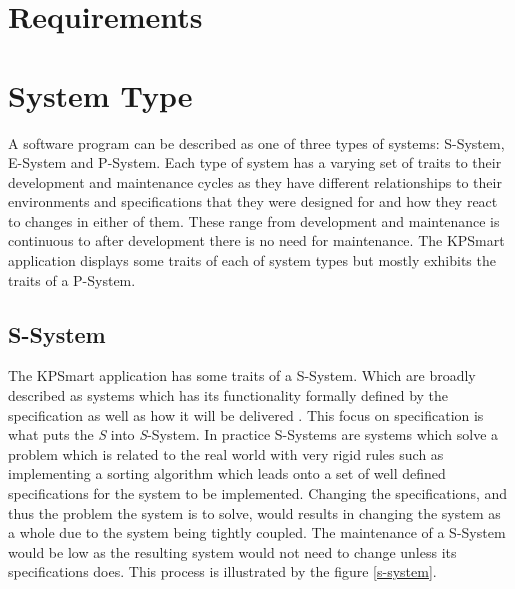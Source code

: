 \documentclass{style/CRPITStyle}
\renewcommand{\cite}{\citep}
\begin{document}
\section{Requirements}


\section{System Type}

A software program can be described as one of three types of systems:
S-System, E-System and P-System. Each type of system has a varying set of traits
to their development and maintenance cycles as they have different relationships
to their environments and specifications that they were designed for and how
they react to changes in either of them. These range from development
and maintenance is continuous to after development there is no need for
maintenance. The KPSmart application displays some traits of each of system
types but mostly exhibits the traits of a P-System.

\subsection{S-System}

The KPSmart application has some traits of a S-System. Which are broadly described as
systems which has its functionality formally defined by the specification as
well as how it will be delivered \cite{lehman:1980}.
This focus on specification is what puts the \emph{S} into \emph{S}-System.
In practice S-Systems are systems which solve a problem which is related to the real world
with very rigid rules such as implementing a sorting algorithm which leads onto a set of well defined
specifications for the system to be implemented.
Changing the specifications, and thus the problem the system is to solve,
would results in changing the system as a whole due to the system being tightly
coupled. The maintenance of a S-System would be low as the resulting system
would not need to change unless its specifications does.
This process is illustrated by the figure \ref{s-system}.
\end{document}
